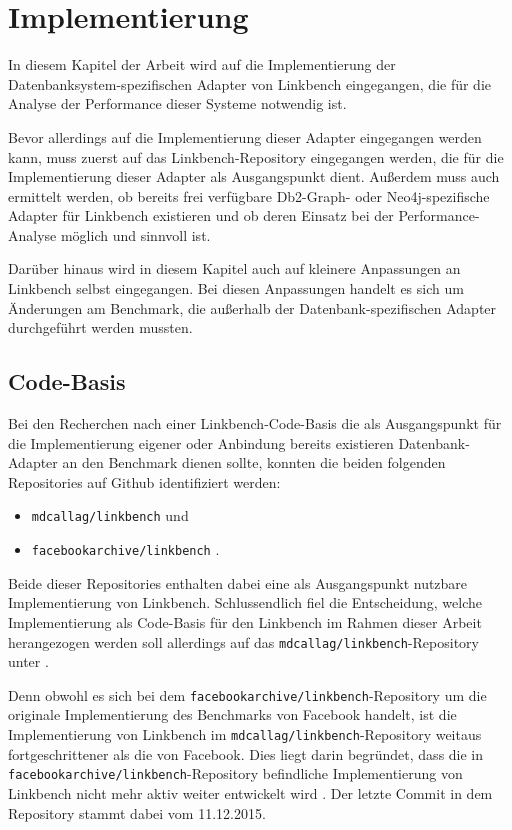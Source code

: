 \chapter{Implementierung}
\label{implementierung}
In diesem Kapitel der Arbeit wird auf die Implementierung der Datenbanksystem-spezifischen Adapter von Linkbench eingegangen, die für die Analyse der Performance dieser Systeme notwendig ist. 

Bevor allerdings auf die Implementierung dieser Adapter eingegangen werden kann, muss zuerst auf das Linkbench-Repository eingegangen werden, die für die Implementierung dieser Adapter als Ausgangspunkt dient. Außerdem muss auch ermittelt werden, ob bereits frei verfügbare Db2-Graph- oder Neo4j-spezifische Adapter für Linkbench existieren und ob deren Einsatz bei der Performance-Analyse möglich und sinnvoll ist.

Darüber hinaus wird in diesem Kapitel auch auf kleinere Anpassungen an Linkbench selbst eingegangen. Bei diesen Anpassungen handelt es sich um Änderungen am Benchmark, die außerhalb der Datenbank-spezifischen Adapter durchgeführt werden mussten.

\section{Code-Basis}
Bei den Recherchen nach einer Linkbench-Code-Basis die als Ausgangspunkt für die Implementierung eigener oder Anbindung bereits existieren Datenbank-Adapter an den Benchmark dienen sollte, konnten die beiden folgenden Repositories auf Github identifiziert werden:
\begin{itemize}
    \item \texttt{mdcallag/linkbench} \cite{mc_linkbench_github} und 
    \item \texttt{facebookarchive/linkbench} \cite{fb_linkbench_github}.
\end{itemize}
Beide dieser Repositories enthalten dabei eine als Ausgangspunkt nutzbare Implementierung von Linkbench. Schlussendlich fiel die Entscheidung, welche Implementierung als Code-Basis für den Linkbench im Rahmen dieser Arbeit herangezogen werden soll allerdings auf das \texttt{mdcallag/linkbench}-Repository unter \cite{mc_linkbench_github}. 

Denn obwohl es sich bei dem \texttt{facebookarchive/linkbench}-Repository um die originale Implementierung des Benchmarks von Facebook handelt, ist die Implementierung von Linkbench im \texttt{mdcallag/linkbench}-Repository weitaus fortgeschrittener als die von Facebook. Dies liegt darin begründet, dass die in \texttt{facebookarchive\allowbreak /linkbench}-Repository befindliche Implementierung von Linkbench nicht mehr aktiv weiter entwickelt wird \cite{fb_linkbench_github}. Der letzte Commit in dem Repository stammt dabei vom 11.12.2015. 

